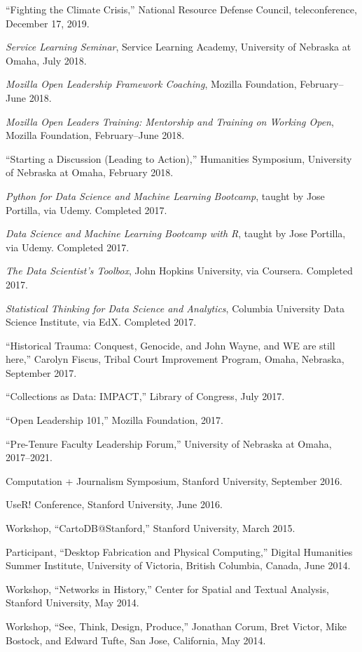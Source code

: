 ``Fighting the Climate Crisis,'' National Resource Defense Council,
teleconference, December 17, 2019.

\emph{Service Learning Seminar}, Service Learning Academy, University of
Nebraska at Omaha, July 2018.

\emph{Mozilla Open Leadership Framework Coaching}, Mozilla Foundation,
February--June 2018.

\emph{Mozilla Open Leaders Training: Mentorship and Training on Working
Open}, Mozilla Foundation, February--June 2018.

``Starting a Discussion (Leading to Action),'' Humanities Symposium,
University of Nebraska at Omaha, February 2018.

\emph{Python for Data Science and Machine Learning Bootcamp}, taught by
Jose Portilla, via Udemy. Completed 2017.

\emph{Data Science and Machine Learning Bootcamp with R}, taught by Jose
Portilla, via Udemy. Completed 2017.

\emph{The Data Scientist's Toolbox}, John Hopkins University, via
Coursera. Completed 2017.

\emph{Statistical Thinking for Data Science and Analytics}, Columbia
University Data Science Institute, via EdX. Completed 2017.

``Historical Trauma: Conquest, Genocide, and John Wayne, and WE are
still here,'' Carolyn Fiscus, Tribal Court Improvement Program, Omaha,
Nebraska, September 2017.

``Collections as Data: IMPACT,'' Library of Congress, July 2017.

``Open Leadership 101,'' Mozilla Foundation, 2017.

``Pre-Tenure Faculty Leadership Forum,'' University of Nebraska at
Omaha, 2017--2021.

Computation + Journalism Symposium, Stanford University, September 2016.

UseR! Conference, Stanford University, June 2016.

Workshop, ``CartoDB@Stanford,'' Stanford University, March 2015.

Participant, ``Desktop Fabrication and Physical Computing,'' Digital
Humanities Summer Institute, University of Victoria, British Columbia,
Canada, June 2014.

Workshop, ``Networks in History,'' Center for Spatial and Textual
Analysis, Stanford University, May 2014.

Workshop, ``See, Think, Design, Produce,'' Jonathan Corum, Bret Victor,
Mike Bostock, and Edward Tufte, San Jose, California, May 2014.

